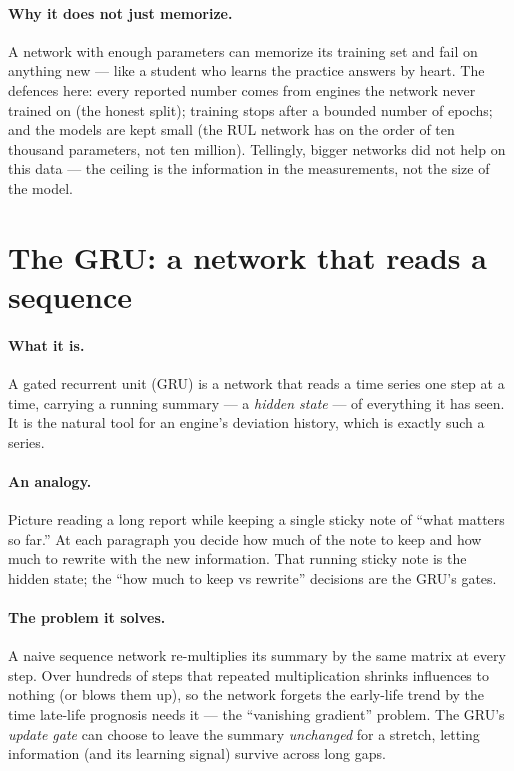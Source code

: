 \paragraph{Why it does not just memorize.} A network with enough parameters can memorize its
training set and fail on anything new --- like a student who learns the practice answers by
heart. The defences here: every reported number comes from engines the network never trained
on (the honest split); training stops after a bounded number of epochs; and the models are
kept small (the RUL network has on the order of ten thousand parameters, not ten million).
Tellingly, bigger networks did not help on this data --- the ceiling is the information in the
measurements, not the size of the model.

\section{The GRU: a network that reads a sequence}
\label{sec:ml-gru}

\paragraph{What it is.} A gated recurrent unit (GRU) is a network that reads a time series one
step at a time, carrying a running summary --- a \emph{hidden state} --- of everything it has
seen. It is the natural tool for an engine's deviation history, which is exactly such a
series.

\paragraph{An analogy.} Picture reading a long report while keeping a single sticky note of
``what matters so far.'' At each paragraph you decide how much of the note to keep and how
much to rewrite with the new information. That running sticky note is the hidden state; the
``how much to keep vs rewrite'' decisions are the GRU's gates.

\paragraph{The problem it solves.} A naive sequence network re-multiplies its summary by the
same matrix at every step. Over hundreds of steps that repeated multiplication shrinks
influences to nothing (or blows them up), so the network forgets the early-life trend by the
time late-life prognosis needs it --- the ``vanishing gradient'' problem. The GRU's
\emph{update gate} can choose to leave the summary \emph{unchanged} for a stretch, letting
information (and its learning signal) survive across long gaps.

